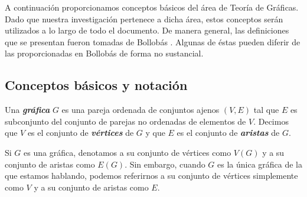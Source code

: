 



A continuación proporcionamos conceptos básicos del área de Teoría de Gráficas. Dado que nuestra investigación pertenece a dicha área, estos conceptos serán utilizados a lo largo de todo el documento. De manera general, las definiciones que se presentan fueron tomadas de Bollobás \cite{Bollobas}. Algunas de éstas pueden diferir de las proporcionadas en Bollobás \cite{Bollobas} de forma no sustancial.

\subsection{Conceptos básicos y notación}

Una \textbf{\emph{gráfica}} $G$ es una pareja ordenada de conjuntos ajenos $(V,E)$ tal que $E$ es subconjunto del conjunto de parejas no ordenadas de elementos de $V$. Decimos que $V$ es el conjunto de \textbf{\emph{vértices}} de $G$ y que $E$ es el conjunto de \textbf{\emph{aristas}} de $G$.

Si $G$ es una gráfica, denotamos a su conjunto de vértices como $V(G)$ y a su conjunto de aristas como $E(G)$. Sin embargo, cuando $G$ es la única gráfica de la que estamos hablando, podemos referirnos a su conjunto de vértices simplemente como $V$ y a su conjunto de aristas como $E$.

